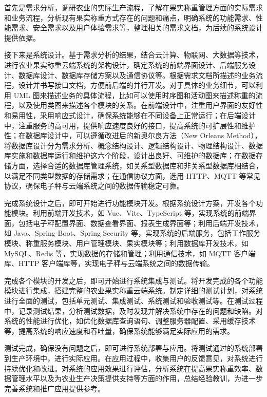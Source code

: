\documentclass{xduugthesis}
\begin{document}
首先是需求分析，调研农业的实际生产流程，了解在果实称重管理方面的实际需求和业务流程，分析现有果实称重方式存在的问题和痛点，明确系统的功能需求、性能需求、安全需求以及用户体验需求等，整理相关的需求文档，为后续的系统设计提供依据。

接下来是系统设计。基于需求分析的结果，结合云计算、物联网、大数据等技术，进行农业果实称重云端系统的架构设计，确定系统的前端界面设计、后端服务设计、数据库设计、数据库存储方案以及通信协议等。根据需求文档所描述的业务流程，设计并书写接口文档，方便前后端的并行开发。对于具体的业务细节，可以利用 UML 图来描述业务的具体流程，比如可以使用时序图和活动图来描述称重的流程，以及使用类图来描述各个模块的关系。在前端设计中，注重用户界面的友好性和易用性，采用响应式设计，确保系统能够在不同设备上正常运行；在后端设计中，注重服务的高可用，提供响应速度良好的接口，提高系统的可扩展性和维护性；在数据库设计中，可以遵循改进后的新奥尔良方法（New Orleans Method），将数据库设计分为需求分析、概念结构设计、逻辑结构设计、物理结构设计、数据库实施和数据库运行和维护这六个阶段，设计出良好、可维护的数据库\cite{苗雪兰2001数据库系统原理及应用教程}；在数据存储方面，选择合适的数据库管理系统，如关系型数据库和非关系型数据库相结合，以满足不同类型数据的存储需求；在通信协议方面，选用 HTTP、MQTT 等常见协议，确保电子秤与云端系统之间的数据传输稳定可靠。

完成系统设计之后，即可开始进行功能模块开发。根据系统设计方案，开发各个功能模块。利用前端开发技术，如 Vue、Vite、TypeScript 等，实现系统的前端界面，包括电子秤配置界面、数据查看界面、报表生成界面等；利用后端开发技术，如 Java、Spring Boot、Spring Security 等，实现系统的后端服务，包括工作服务模块、称重服务模块、用户管理模块、果实模块等；利用数据库开发技术，如 MySQL、Redis 等，实现数据的存储和管理；利用通信技术，如 MQTT 客户端库、HTTP 客户端库等，实现电子秤与云端系统之间的数据传输。

完成各个模块的开发之后，即可开始进行系统集成与测试。将开发完成的各个功能模块进行集成，搭建完整的农业果实称重云端系统。制定详细的测试计划，对系统进行全面的测试，包括单元测试、集成测试、系统测试和验收测试等。在测试过程中，记录测试结果，分析测试数据，及时发现并解决系统中存在的问题和缺陷。对系统的性能进行优化，如优化数据库查询语句、调整服务器配置、采用缓存技术等，提高系统的响应速度和吞吐量，确保系统能够满足实际应用的需求。

测试完成，确保没有问题之后，即可进行系统部署与应用。将测试通过的系统部署到生产环境中，进行实际应用。在应用过程中，收集用户的反馈意见，对系统进行持续优化和改进。对系统的应用效果进行评估，分析系统在提高果实称重效率、数据管理水平以及为农业生产决策提供支持等方面的作用，总结经验教训，为进一步完善系统和推广应用提供参考。
\end{document}
